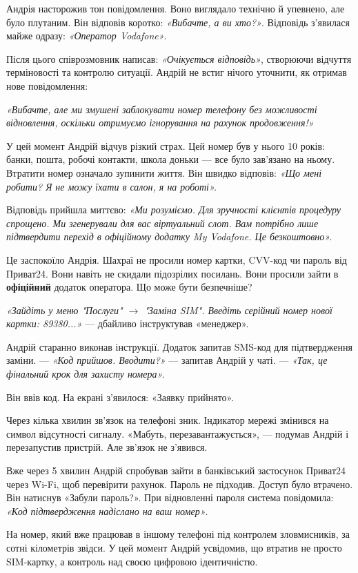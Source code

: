 Андрія насторожив тон повідомлення. Воно виглядало технічно й упевнено, але було плутаним. Він відповів коротко: \textit{«Вибачте, а ви хто?»}. 
Відповідь з’явилася майже одразу: \textit{«Оператор Vodafone»}.

Після цього співрозмовник написав: \textit{«Очікується відповідь»}, створюючи відчуття терміновості та контролю ситуації. Андрій не встиг нічого уточнити, як отримав нове повідомлення:

\textit{«Вибачте, але ми змушені заблокувати номер телефону без можливості відновлення, оскільки отримуємо ігнорування на рахунок продовження!»}

У цей момент Андрій відчув різкий страх. Цей номер був у нього 10 років: банки, пошта, робочі контакти, школа доньки — все було зав'язано на ньому. Втратити номер означало зупинити життя. Він швидко відповів: \textit{«Що мені робити? Я не можу їхати в салон, я на роботі».}

Відповідь прийшла миттєво: \textit{«Ми розуміємо. Для зручності клієнтів процедуру спрощено. Ми згенерували для вас віртуальний слот. Вам потрібно лише підтвердити перехід в офіційному додатку My Vodafone. Це безкоштовно».}

Це заспокоїло Андрія. Шахраї не просили номер картки, CVV-код чи пароль від Приват24. Вони навіть не скидали підозрілих посилань. Вони просили зайти в \textbf{офіційний} додаток оператора. Що може бути безпечніше?

\textit{«Зайдіть у меню "Послуги" $\rightarrow$ "Заміна SIM". Введіть серійний номер нової картки: 89380...»} — дбайливо інструктував «менеджер».

Андрій старанно виконав інструкції. Додаток запитав SMS-код для підтвердження заміни. 
— \textit{«Код прийшов. Вводити?»} — запитав Андрій у чаті.
— \textit{«Так, це фінальний крок для захисту номера».}

Він ввів код. На екрані з'явилося: «Заявку прийнято».

Через кілька хвилин зв’язок на телефоні зник. Індикатор мережі змінився на символ відсутності сигналу. «Мабуть, перезавантажується», — подумав Андрій і перезапустив пристрій. Але зв'язок не з'явився.

Вже через 5 хвилин Андрій спробував зайти в банківський застосунок Приват24 через Wi-Fi, щоб перевірити рахунок. Пароль не підходив. Доступ було втрачено. Він натиснув «Забули пароль?». При відновленні пароля система повідомила: \textit{«Код підтвердження надіслано на ваш номер»}. 

На номер, який вже працював в іншому телефоні під контролем зловмисників, за сотні кілометрів звідси. У цей момент Андрій усвідомив, що втратив не просто SIM-картку, а контроль над своєю цифровою ідентичністю.

